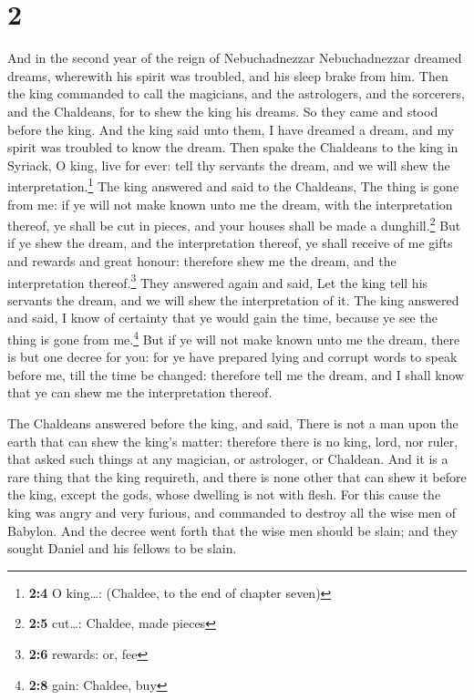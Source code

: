 \hypertarget{section-1}{%
\section{2}\label{section-1}}

 And in the second year of the reign of Nebuchadnezzar
Nebuchadnezzar dreamed dreams, wherewith his spirit was troubled, and
his sleep brake from him.  Then the king commanded to call
the magicians, and the astrologers, and the sorcerers, and the
Chaldeans, for to shew the king his dreams. So they came and stood
before the king.  And the king said unto them, I have
dreamed a dream, and my spirit was troubled to know the dream.
 Then spake the Chaldeans to the king in Syriack, O king,
live for ever: tell thy servants the dream, and we will shew the
interpretation.\footnote{\textbf{2:4} O king\ldots: (Chaldee, to the end
  of chapter seven)}  The king answered and said to the
Chaldeans, The thing is gone from me: if ye will not make known unto me
the dream, with the interpretation thereof, ye shall be cut in pieces,
and your houses shall be made a dunghill.\footnote{\textbf{2:5}
  cut\ldots: Chaldee, made pieces}  But if ye shew the
dream, and the interpretation thereof, ye shall receive of me gifts and
rewards and great honour: therefore shew me the dream, and the
interpretation thereof.\footnote{\textbf{2:6} rewards: or, fee}
 They answered again and said, Let the king tell his
servants the dream, and we will shew the interpretation of it.
 The king answered and said, I know of certainty that ye
would gain the time, because ye see the thing is gone from
me.\footnote{\textbf{2:8} gain: Chaldee, buy}  But if ye
will not make known unto me the dream, there is but one decree for you:
for ye have prepared lying and corrupt words to speak before me, till
the time be changed: therefore tell me the dream, and I shall know that
ye can shew me the interpretation thereof.

 The Chaldeans answered before the king, and said, There
is not a man upon the earth that can shew the king's matter: therefore
there is no king, lord, nor ruler, that asked such things at any
magician, or astrologer, or Chaldean.  And it is a rare
thing that the king requireth, and there is none other that can shew it
before the king, except the gods, whose dwelling is not with flesh.
 For this cause the king was angry and very furious, and
commanded to destroy all the wise men of Babylon.  And
the decree went forth that the wise men should be slain; and they sought
Daniel and his fellows to be slain.


